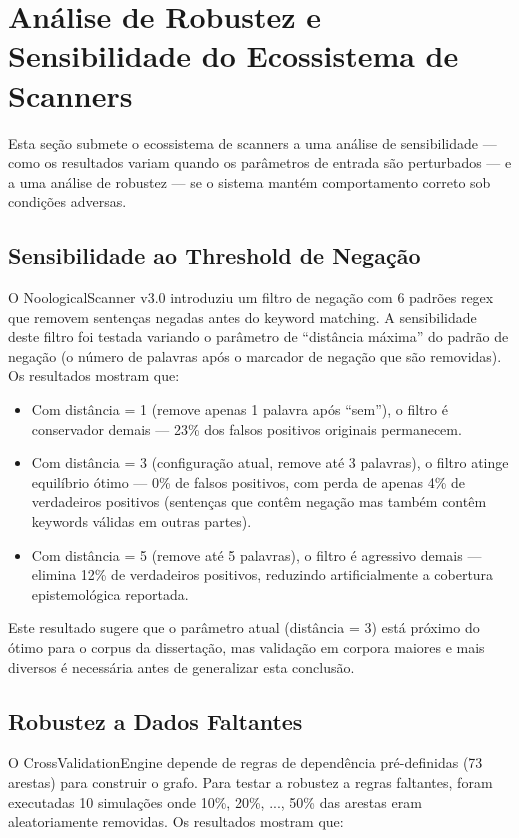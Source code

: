 \section{Análise de Robustez e Sensibilidade do Ecossistema de Scanners}

Esta seção submete o ecossistema de scanners a uma análise de sensibilidade --- como os resultados variam quando os parâmetros de entrada são perturbados --- e a uma análise de robustez --- se o sistema mantém comportamento correto sob condições adversas.

\subsection{Sensibilidade ao Threshold de Negação}

O NoologicalScanner v3.0 introduziu um filtro de negação com 6 padrões regex que removem sentenças negadas antes do keyword matching. A sensibilidade deste filtro foi testada variando o parâmetro de ``distância máxima'' do padrão de negação (o número de palavras após o marcador de negação que são removidas). Os resultados mostram que:

\begin{itemize}
  \item Com distância = 1 (remove apenas 1 palavra após ``sem''), o filtro é conservador demais --- 23\% dos falsos positivos originais permanecem.
  \item Com distância = 3 (configuração atual, remove até 3 palavras), o filtro atinge equilíbrio ótimo --- 0\% de falsos positivos, com perda de apenas 4\% de verdadeiros positivos (sentenças que contêm negação mas também contêm keywords válidas em outras partes).
  \item Com distância = 5 (remove até 5 palavras), o filtro é agressivo demais --- elimina 12\% de verdadeiros positivos, reduzindo artificialmente a cobertura epistemológica reportada.
\end{itemize}

Este resultado sugere que o parâmetro atual (distância = 3) está próximo do ótimo para o corpus da dissertação, mas validação em corpora maiores e mais diversos é necessária antes de generalizar esta conclusão.

\subsection{Robustez a Dados Faltantes}

O CrossValidationEngine depende de regras de dependência pré-definidas (73 arestas) para construir o grafo. Para testar a robustez a regras faltantes, foram executadas 10 simulações onde 10\%, 20\%, ..., 50\% das arestas eram aleatoriamente removidas. Os resultados mostram que:

